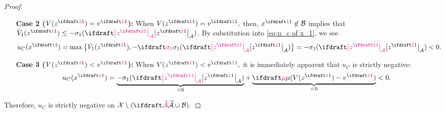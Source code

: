 {\begin{proof}
\begin{itemize}
        \item[\textbf{Case 2 ($V(z\ssone) = v\ssone$):}] When $V(z\ssone) = v\ssone,$ 
        then, $x\ssone \not\in \calB$ 
        implies that $\dot V_1(z\ssone) \leq -\sigma_1(\distA{z\ssone})$.
        By substitution into \cref{eq:u_c of x_1}, we see
        \begin{align*}
            u_C(x\ssone) 
            &= \max\left\{ \dot V_1(z\ssone), 
                                -\sigmaone(\distA{z\ssone}) \right\} 
            = -\sigma_1(\distA{z\ssone}) < 0.
        \end{align*}

        \item[\textbf{Case 3 ($V(z\ssone) < v\ssone$):}] When $V(z\ssone) < v\ssone,$ 
        it is immediately apparent that $u_C$ is strictly negative:
        $$ u_C(x\ssone) = \underbrace{-\sigma_1(\distA{z\ssone})}_{< 0} 
                        + \underbrace{\vdiffcoeff(V(z\ssone) - v\ssone)}_{< 0}
                    < 0.$$
    \end{itemize}
    Therefore, $u_C$ is strictly negative on $\calX \setminus(\calAX \union \calB).$
    

\end{proof}}
